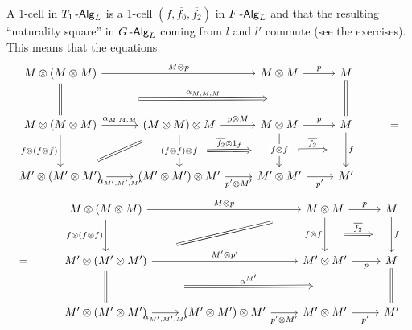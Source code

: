 \documentclass[a4paper,11pt,oneside,openany]{scrbook}
\begin{document}
A 1-cell in $T_1\operatorname{-\mathsf{Alg}}_L$ is a 1-cell $(f,\overline{f_0},\overline{f_2})$ in
$F\operatorname{-\mathsf{Alg}}_L$ and that the resulting ``naturality square'' in $G\operatorname{-\mathsf{Alg}}_L$ coming from
$l$ and $l'$ commute (see the exercises). This means that the equations
\[\begin{tikzcd}[row sep=1cm]
	{M\otimes(M\otimes M)} && {M\otimes M} & M\\
	{M\otimes(M\otimes M)} & {(M\otimes M)\otimes M} & {M\otimes M} & M & {=} \\
	{M'\otimes(M'\otimes M')} & {(M'\otimes M')\otimes M'} & {M'\otimes M'} & {M'}
	\arrow["p", from=1-3, to=1-4]
	\arrow[""{name=0, anchor=center, inner sep=0}, Rightarrow, no head, from=1-4, to=2-4]
	\arrow["p", from=2-3, to=2-4]
	\arrow["{p\otimes M}", from=2-2, to=2-3]
	\arrow["{\alpha_{M,M,M}}", from=2-1, to=2-2]
	\arrow[""{name=1, anchor=center, inner sep=0}, Rightarrow, no head, from=1-1, to=2-1]
	\arrow["{M\otimes p}", from=1-1, to=1-3]
	\arrow["{p'}"', from=3-3, to=3-4]
	\arrow[""{name=2, anchor=center, inner sep=0}, "f", from=2-4, to=3-4]
	\arrow[""{name=3, anchor=center, inner sep=0}, "{(f\otimes f)\otimes f}"{description}, from=2-2, to=3-2]
	\arrow["{p'\otimes M'}"', from=3-2, to=3-3]
	\arrow[""{name=4, anchor=center, inner sep=0}, "{f\otimes f}"{description}, from=2-3, to=3-3]
	\arrow["{\alpha_{M',M',M'}}"', from=3-1, to=3-2]
	\arrow["{f\otimes(f\otimes f)}"', from=2-1, to=3-1]
	\arrow[shorten <=14pt, shorten >=14pt, Rightarrow, no head, from=3-1, to=2-2]
	\arrow["{\alpha_{M,M,M}}", shorten <=69pt, shorten >=69pt, Rightarrow, from=1, to=0]
	\arrow["{\overline{f_2}\otimes 1_f}", shorten <=24pt, shorten >=24pt, Rightarrow, from=3, to=4]
	\arrow["{\overline{f_2}}", shorten <=16pt, shorten >=16pt, Rightarrow, from=4, to=2]
\end{tikzcd}\]
\[\begin{tikzcd}[row sep=1cm]
	& {M\otimes(M\otimes M)} && {M\otimes M} & M \\
	{=} & {M'\otimes (M'\otimes M')} && {M'\otimes M'} & M \\
	& {M'\otimes(M'\otimes M')} & {(M'\otimes M')\otimes M'} & {M'\otimes M'} & {M'}
	\arrow["{M\otimes p}", from=1-2, to=1-4]
	\arrow["p", from=1-4, to=1-5]
	\arrow["{f\otimes(f\otimes f)}"', from=1-2, to=2-2]
	\arrow["{M'\otimes p'}", from=2-2, to=2-4]
	\arrow["p"', from=2-4, to=2-5]
	\arrow[""{name=0, anchor=center, inner sep=0}, "{f\otimes f}"', from=1-4, to=2-4]
	\arrow[""{name=1, anchor=center, inner sep=0}, "f", from=1-5, to=2-5]
	\arrow["{\alpha_{M',M',M'}}"', from=3-2, to=3-3]
	\arrow["{p'\otimes M'}"', from=3-3, to=3-4]
	\arrow["{p'}"', from=3-4, to=3-5]
	\arrow[""{name=2, anchor=center, inner sep=0}, Rightarrow, no head, from=2-5, to=3-5]
	\arrow[shorten <=26pt, shorten >=26pt, Rightarrow, no head, from=2-2, to=1-4]
	\arrow[""{name=3, anchor=center, inner sep=0}, Rightarrow, no head, from=2-2, to=3-2]
	\arrow["{\alpha^{M'}}", shorten <=69pt, shorten >=69pt, Rightarrow, from=3, to=2]
	\arrow["{\overline{f_2}}", shorten <=16pt, shorten >=16pt, Rightarrow, from=0, to=1]
\end{tikzcd}\]
\end{document}
